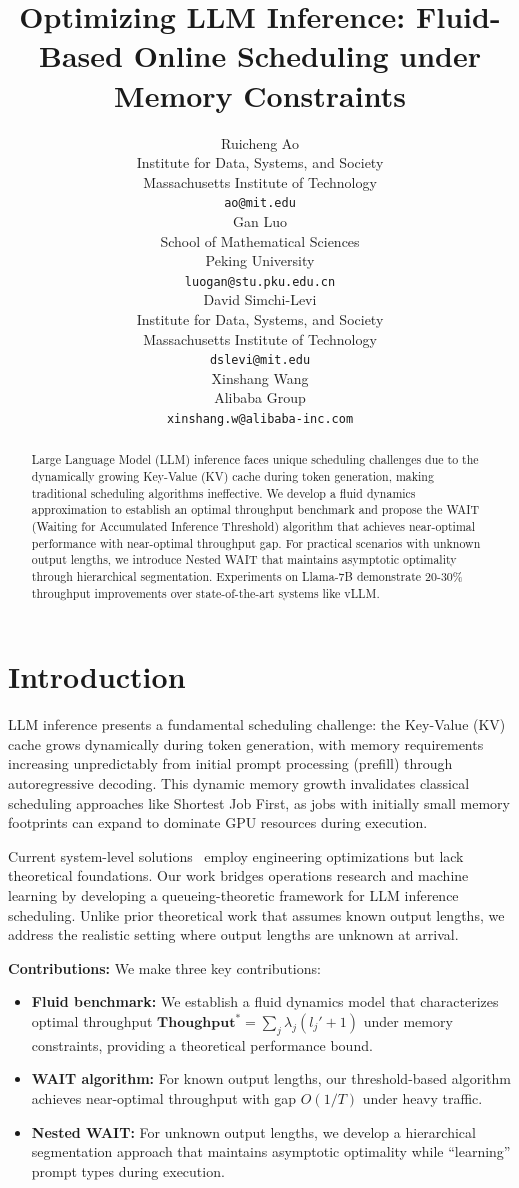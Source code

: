 \documentclass[preprint]{article}
\title{Optimizing LLM Inference: Fluid-Based Online Scheduling under Memory Constraints}
\author{%
  Ruicheng Ao \\
  Institute for Data, Systems, and Society \\
  Massachusetts Institute of Technology \\
  \texttt{ao@mit.edu} \\
  \And
 Gan Luo \\
  School of Mathematical Sciences \\
  Peking University \\
  \texttt{luogan@stu.pku.edu.cn} \\
  \And
  David Simchi-Levi \\
  Institute for Data, Systems, and Society \\
  Massachusetts Institute of Technology \\
  \texttt{dslevi@mit.edu} \\
  \And
    Xinshang Wang \\
  Alibaba Group \\
  \texttt{xinshang.w@alibaba-inc.com} \\
}
\newcommand{\throughput}{\textbf{Thoughput}}
\theoremstyle{plain}
\theoremstyle{definition}
\theoremstyle{remark}
\begin{document}

\maketitle
\begin{abstract}
Large Language Model (LLM) inference faces unique scheduling challenges due to the dynamically growing Key-Value (KV) cache during token generation, making traditional scheduling algorithms ineffective. We develop a fluid dynamics approximation to establish an optimal throughput benchmark and propose the WAIT (Waiting for Accumulated Inference Threshold) algorithm that achieves near-optimal performance with near-optimal throughput gap. For practical scenarios with unknown output lengths, we introduce Nested WAIT that maintains asymptotic optimality through hierarchical segmentation. Experiments on Llama-7B demonstrate 20-30\% throughput improvements over state-of-the-art systems like vLLM.
\end{abstract}

\section{Introduction}

LLM inference presents a fundamental scheduling challenge: the Key-Value (KV) cache grows dynamically during token generation, with memory requirements increasing unpredictably from initial prompt processing (prefill) through autoregressive decoding. This dynamic memory growth invalidates classical scheduling approaches like Shortest Job First, as jobs with initially small memory footprints can expand to dominate GPU resources during execution.

Current system-level solutions~\cite{kwon2023efficient,agrawal2023sarathi} employ engineering optimizations but lack theoretical foundations. Our work bridges operations research and machine learning by developing a queueing-theoretic framework for LLM inference scheduling. Unlike prior theoretical work that assumes known output lengths, we address the realistic setting where output lengths are unknown at arrival.

\textbf{Contributions:} We make three key contributions:
\begin{itemize}
\item \textbf{Fluid benchmark:} We establish a fluid dynamics model that characterizes optimal throughput $\throughput^* = \sum_j \lambda_j(l_j'+1)$ under memory constraints, providing a theoretical performance bound.
\item \textbf{WAIT algorithm:} For known output lengths, our threshold-based algorithm achieves near-optimal throughput with gap $O(1/T)$ under heavy traffic.
\item \textbf{Nested WAIT:} For unknown output lengths, we develop a hierarchical segmentation approach that maintains asymptotic optimality while ``learning'' prompt types during execution.
\end{itemize}
\end{document}
